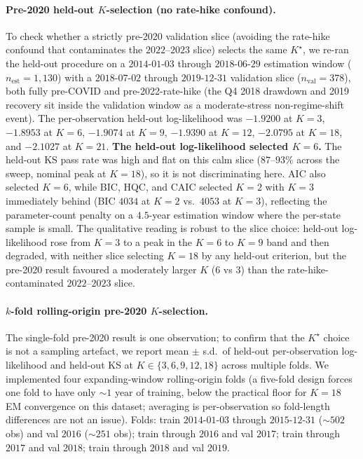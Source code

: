 \paragraph{Pre-2020 held-out $K$-selection (no rate-hike confound).}
To check whether a strictly pre-2020 validation slice (avoiding the rate-hike confound that contaminates the $2022$--$2023$ slice) selects the same $K^\star$, we re-ran the held-out procedure on a $2014$-$01$-$03$ through $2018$-$06$-$29$ estimation window ($n_{\text{est}} = 1{,}130$) with a $2018$-$07$-$02$ through $2019$-$12$-$31$ validation slice ($n_{\text{val}} = 378$), both fully pre-COVID and pre-2022-rate-hike (the Q4 2018 drawdown and 2019 recovery sit inside the validation window as a moderate-stress non-regime-shift event). The per-observation held-out log-likelihood was $-1.9200$ at $K = 3$, $-1.8953$ at $K = 6$, $-1.9074$ at $K = 9$, $-1.9390$ at $K = 12$, $-2.0795$ at $K = 18$, and $-2.1027$ at $K = 21$. \textbf{The held-out log-likelihood selected $K = 6$.} The held-out KS pass rate was high and flat on this calm slice ($87$--$93\%$ across the sweep, nominal peak at $K = 18$), so it is not discriminating here. AIC also selected $K = 6$, while BIC, HQC, and CAIC selected $K = 2$ with $K = 3$ immediately behind (BIC $4034$ at $K = 2$ vs.\ $4053$ at $K = 3$), reflecting the parameter-count penalty on a $4.5$-year estimation window where the per-state sample is small. The qualitative reading is robust to the slice choice: held-out log-likelihood rose from $K = 3$ to a peak in the $K = 6$ to $K = 9$ band and then degraded, with neither slice selecting $K = 18$ by any held-out criterion, but the pre-2020 result favoured a moderately larger $K$ ($6$ vs $3$) than the rate-hike-contaminated $2022$--$2023$ slice.

\paragraph{$k$-fold rolling-origin pre-2020 $K$-selection.}
\label{sec:k_selection_kfold_pre2020}
The single-fold pre-2020 result is one observation; to confirm that the $K^\star$ choice is not a sampling artefact, we report mean $\pm$ s.d.\ of held-out per-observation log-likelihood and held-out KS at $K \in \{3, 6, 9, 12, 18\}$ across multiple folds. We implemented four expanding-window rolling-origin folds (a five-fold design forces one fold to have only $\sim 1$ year of training, below the practical floor for $K = 18$ EM convergence on this dataset; averaging is per-observation so fold-length differences are not an issue). Folds: train $2014$-$01$-$03$ through $2015$-$12$-$31$ ($\sim 502$ obs) and val $2016$ ($\sim 251$ obs); train through $2016$ and val $2017$; train through $2017$ and val $2018$; train through $2018$ and val $2019$.

